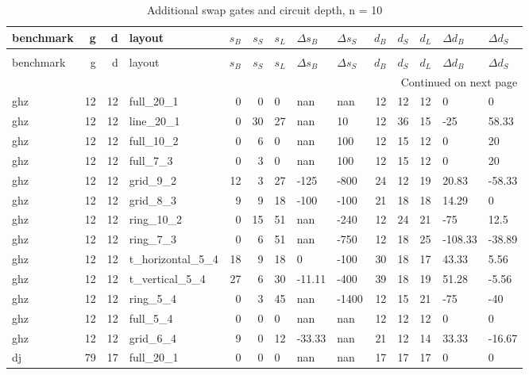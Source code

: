\begin{longtable}{lrrlrrlllrrlll}
\caption{Additional swap gates and circuit depth, n = 10} \label{benchmark-table-10} \\
\toprule
benchmark & g & d & layout & $s_B$ & $s_S$ & $s_L$ & $\Delta s_B$ & $\Delta s_S$ & $d_B$ & $d_S$ & $d_L$ & $\Delta d_B$ & $\Delta d_S$ \\
\midrule
\endfirsthead
\caption[]{Additional swap gates and circuit depth, n = 10} \\
\toprule
benchmark & g & d & layout & $s_B$ & $s_S$ & $s_L$ & $\Delta s_B$ & $\Delta s_S$ & $d_B$ & $d_S$ & $d_L$ & $\Delta d_B$ & $\Delta d_S$ \\
\midrule
\endhead
\midrule
\multicolumn{14}{r}{Continued on next page} \\
\midrule
\endfoot
\bottomrule
\endlastfoot
ghz & 12 & 12 & full\_20\_1 & 0 & 0 & 0 & nan & nan & 12 & 12 & 12 & 0 & 0 \\
ghz & 12 & 12 & line\_20\_1 & 0 & 30 & 27 & nan & 10 & 12 & 36 & 15 & -25 & 58.33 \\
ghz & 12 & 12 & full\_10\_2 & 0 & 6 & 0 & nan & 100 & 12 & 15 & 12 & 0 & 20 \\
ghz & 12 & 12 & full\_7\_3 & 0 & 3 & 0 & nan & 100 & 12 & 15 & 12 & 0 & 20 \\
ghz & 12 & 12 & grid\_9\_2 & 12 & 3 & 27 & -125 & -800 & 24 & 12 & 19 & 20.83 & -58.33 \\
ghz & 12 & 12 & grid\_8\_3 & 9 & 9 & 18 & -100 & -100 & 21 & 18 & 18 & 14.29 & 0 \\
ghz & 12 & 12 & ring\_10\_2 & 0 & 15 & 51 & nan & -240 & 12 & 24 & 21 & -75 & 12.5 \\
ghz & 12 & 12 & ring\_7\_3 & 0 & 6 & 51 & nan & -750 & 12 & 18 & 25 & -108.33 & -38.89 \\
ghz & 12 & 12 & t\_horizontal\_5\_4 & 18 & 9 & 18 & 0 & -100 & 30 & 18 & 17 & 43.33 & 5.56 \\
ghz & 12 & 12 & t\_vertical\_5\_4 & 27 & 6 & 30 & -11.11 & -400 & 39 & 18 & 19 & 51.28 & -5.56 \\
ghz & 12 & 12 & ring\_5\_4 & 0 & 3 & 45 & nan & -1400 & 12 & 15 & 21 & -75 & -40 \\
ghz & 12 & 12 & full\_5\_4 & 0 & 0 & 0 & nan & nan & 12 & 12 & 12 & 0 & 0 \\
ghz & 12 & 12 & grid\_6\_4 & 9 & 0 & 12 & -33.33 & nan & 21 & 12 & 14 & 33.33 & -16.67 \\
dj & 79 & 17 & full\_20\_1 & 0 & 0 & 0 & nan & nan & 17 & 17 & 17 & 0 & 0 \\

\end{longtable}
